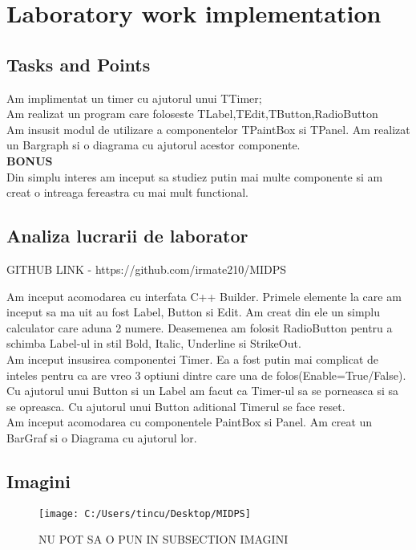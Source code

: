 \section{Laboratory work implementation}

\subsection{Tasks and Points}

Am implimentat un timer cu ajutorul unui TTimer;\\
Am realizat un program care foloseste TLabel,TEdit,TButton,RadioButton\\
Am insusit modul de utilizare a componentelor TPaintBox si TPanel. Am realizat un Bargraph si o diagrama cu ajutorul acestor componente.\\

\textbf{BONUS}\\
Din simplu interes am inceput sa studiez putin mai multe componente si am creat o intreaga fereastra cu mai mult functional.



\subsection{Analiza lucrarii de laborator}

GITHUB LINK - https://github.com/irmate210/MIDPS

Am inceput acomodarea cu interfata C++ Builder. Primele elemente la care am inceput sa ma uit au fost Label, Button si Edit. Am creat din ele un simplu calculator care aduna 2 numere. Deasemenea am folosit RadioButton pentru a schimba Label-ul in stil Bold, Italic, Underline si StrikeOut.\\
Am inceput insusirea componentei Timer. Ea a fost putin mai complicat de inteles pentru ca are vreo 3 optiuni dintre care una de folos(Enable=True/False). Cu ajutorul unui Button si un Label am facut ca Timer-ul sa se porneasca si sa se opreasca. Cu ajutorul unui Button aditional Timerul se face reset.\\
Am inceput acomodarea cu componentele PaintBox si Panel. Am creat un BarGraf si o Diagrama cu ajutorul lor.

\subsection{Imagini}

\begin{figure}
\centering
\texttt{[image: C:/Users/tincu/Desktop/MIDPS]}
\caption{NU POT SA O PUN IN SUBSECTION IMAGINI}
\label{fig:MIDPS}
\end{figure}



\clearpage